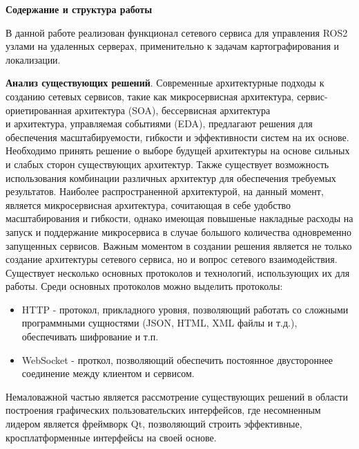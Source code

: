 \documentclass[a4paper, 14pt]{extreport}
\begin{document}
\vspace{2mm}
\par\noindent\textbf{Содержание и структура работы}
\vspace{2mm}
\par В данной работе реализован функционал сетевого сервиса для управления ROS2 узлами на удаленных серверах, применительно к
 задачам картографирования и локализации.
\par \textbf{Анализ существующих решений}. Современные архитектурные подходы к созданию сетевых сервисов, такие как микросервисная
 архитектура\cite{microServiceBook}\cite{microServiceBook1}, сервис-ориетированная архитектура (SOA)\cite{soaBook}\cite{soaBook1},
 бессервисная архи\-те\-кту\-ра\\\cite{serverlessBook}\cite{serverlessBook1}\cite{serverlessArt1} и архитектура, управляемая событиями (EDA)\cite{edaBook}, предлагают 
 решения для обеспечения масштабируемости, гибкости и эффективности систем на их основе. Необходимо принять решение о выборе будущей архитектуры на основе 
 сильных и слабых сторон существующих архитектур. Также существует возможность использования комбинации различных архитектур для обеспечения требуемых 
 результатов. Наиболее распространенной архитектурой, на данный момент, является микросервисная архитектура, сочитающая в себе удобство масштабирования
 и гибкости, однако имеющая повышеные накладные расходы на запуск и поддержание микросервиса в случае большого количества одновременно запущенных сервисов.
 Важным моментом
 в создании решения является не только создание архитектуры сетевого сервиса, но и вопрос сетевого взаимодействия. Существует несколько
 основных протоколов\cite{protocolBook}\cite{protocolArt1} и технологий, использующих их для работы. Среди основных протоколов можно выделить протоколы: 
 \begin{itemize}
        \item HTTP - протокол, прикладного уровня, позволяющий работать со сложными программными сущностями (JSON, HTML, XML файлы и т.д.), обеспечивать шифрование и т.п.
        \item  WebSocket - проткол, позволяющий обеспечить постоянное двустороннее соединение между клиентом и сервисом.
\end{itemize}
 Немаловажной частью является рассмотрение существующих 
 решений в области построения графических пользовательских интерфейсов\cite{guiBrief}\cite{guiArt1}, где несомненным лидером является фреймворк Qt, позволяющий 
 строить эффективные, кросплатформенные интерфейсы на своей основе.
\end{document}
